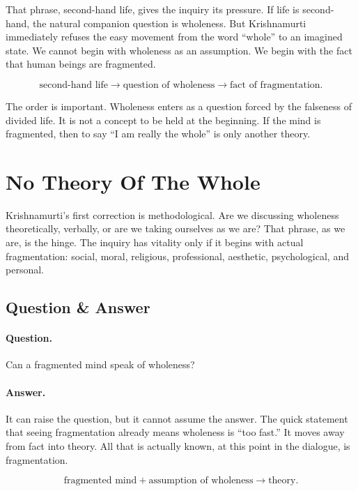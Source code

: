 \documentclass[11pt,oneside]{book}
\begin{document}
That phrase, second-hand life, gives the inquiry its pressure. If life is second-hand, the natural companion question is wholeness. But Krishnamurti immediately refuses the easy movement from the word ``whole'' to an imagined state. We cannot begin with wholeness as an assumption. We begin with the fact that human beings are fragmented.

\begin{equation}
\text{second-hand life}
\longrightarrow
\text{question of wholeness}
\longrightarrow
\text{fact of fragmentation}.
\end{equation}

The order is important. Wholeness enters as a question forced by the falseness of divided life. It is not a concept to be held at the beginning. If the mind is fragmented, then to say ``I am really the whole'' is only another theory.

\section{No Theory Of The Whole}

Krishnamurti's first correction is methodological. Are we discussing wholeness theoretically, verbally, or are we taking ourselves as we are? That phrase, as we are, is the hinge. The inquiry has vitality only if it begins with actual fragmentation: social, moral, religious, professional, aesthetic, psychological, and personal.

\subsection{Question \& Answer}

\paragraph{Question.}
Can a fragmented mind speak of wholeness?

\paragraph{Answer.}
It can raise the question, but it cannot assume the answer. The quick statement that seeing fragmentation already means wholeness is ``too fast.'' It moves away from fact into theory. All that is actually known, at this point in the dialogue, is fragmentation.

\begin{equation}
\text{fragmented mind}
+
\text{assumption of wholeness}
\longrightarrow
\text{theory}.
\end{equation}
\end{document}

